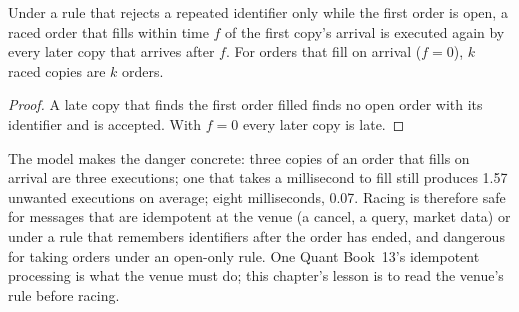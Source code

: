 \begin{omfigure}

\label{fig:nw:cross-region-crypto-networks:dups}
\end{omfigure}

\begin{proposition}\label{prop:nw:cross-region-crypto-networks:dup}
Under a rule that rejects a repeated identifier only while the first order is open, a raced order that fills within time $f$ of the first copy's
arrival is executed again by every later copy that arrives after $f$. For orders that fill on arrival ($f = 0$), $k$ raced copies are $k$ orders.
\end{proposition}

\begin{proof}
A late copy that finds the first order filled finds no open order with its identifier and is accepted. With $f = 0$ every later copy is late.
\end{proof}

The model makes the danger concrete: three copies of an order that fills on arrival are three executions; one that takes a millisecond to fill
still produces 1.57 unwanted executions on average; eight milliseconds, 0.07. Racing is therefore safe for messages that are idempotent at the
venue (a cancel, a query, market data) or under a rule that remembers identifiers after the order has ended, and dangerous for taking orders under an
open-only rule. One Quant Book~13's idempotent processing is what the venue must do; this chapter's lesson is to read the venue's rule before racing.

